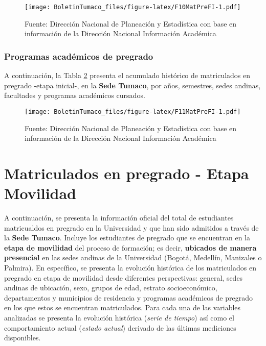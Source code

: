\documentclass[
]{book}
\begin{document}
\begin{figure}
\centering
\texttt{[image: BoletinTumaco\_files/figure-latex/F10MatPreFI-1.pdf]}
\caption{\label{fig:F10MatPreFI}Fuente: Dirección Nacional de Planeación y Estadística con base en información de la Dirección Nacional Información Académica}
\end{figure}

\hypertarget{programas-acaduxe9micos-de-pregrado-2}{%
\subsubsection{Programas académicos de pregrado}\label{programas-acaduxe9micos-de-pregrado-2}}

A continuación, la Tabla \ref{fig:F11MatPreFI} presenta el acumulado histórico de matriculados en pregrado -etapa inicial-, en la \textbf{Sede Tumaco}, por años, semestres, sedes andinas, facultades y programas académicos cursados.

\begin{figure}
\centering
\texttt{[image: BoletinTumaco\_files/figure-latex/F11MatPreFI-1.pdf]}
\caption{\label{fig:F11MatPreFI}Fuente: Dirección Nacional de Planeación y Estadística con base en información de la Dirección Nacional Información Académica}
\end{figure}

\hypertarget{MatPreMov}{%
\section{Matriculados en pregrado - Etapa Movilidad}\label{MatPreMov}}

A continuación, se presenta la información oficial del total de estudiantes matricualdos en pregrado en la Universidad y que han sido admitidos a través de la \textbf{Sede Tumaco}. Incluye los estudiantes de pregrado que se encuentran en la \textbf{etapa de movilidad} del proceso de formación; es decir, \textbf{ubicados de manera presencial} en las sedes andinas de la Universidad (Bogotá, Medellín, Manizales o Palmira). En específico, se presenta la evolución histórica de los matriculados en pregrado en etapa de movilidad desde diferentes perspectivas: general, sedes andinas de ubicación, sexo, grupos de edad, estrato socioeconómico, departamentos y municipios de residencia y programas académicos de pregrado en los que estos se encuentran matriculados. Para cada una de las variables analizadas se presenta la evolución histórica (\emph{serie de tiempo}) así como el comportamiento actual (\emph{estado actual}) derivado de las últimas mediciones disponibles.
\end{document}
